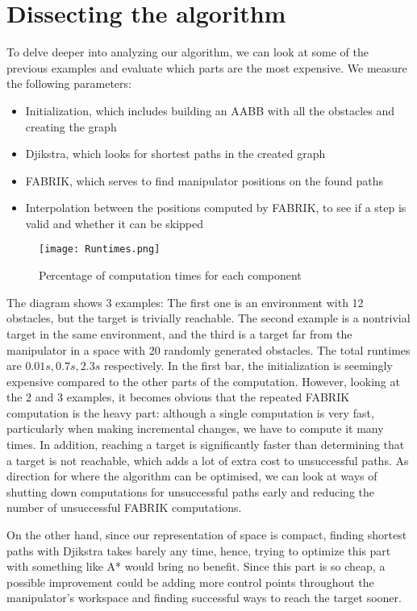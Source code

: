 \newpage

\section{Dissecting the algorithm}

To delve deeper into analyzing our algorithm, we can look at some of the previous examples and evaluate which parts are the most expensive. We measure the following parameters:

\begin{itemize}
\item Initialization, which includes building an AABB with all the obstacles and creating the graph
\item Djikstra, which looks for shortest paths in the created graph
\item FABRIK, which serves to find manipulator positions on the found paths
\item Interpolation between the positions computed by FABRIK, to see if a step is valid and whether it can be skipped
\end{itemize}

\begin{wrapfigure}{r}{0.50\textwidth}
  \centering
  \texttt{[image: Runtimes.png]}
  \caption{Percentage of computation times for each component}
\end{wrapfigure}

The diagram shows 3 examples: The first one is an environment with 12 obstacles, but the target is trivially reachable. The second example is a nontrivial target in the same environment, and the third is a target far from the manipulator in a space with 20 randomly generated obstacles. The total runtimes are $0.01s, 0.7s, 2.3s$ respectively. In the first bar, the initialization is seemingly expensive compared to the other parts of the computation. However, looking at the 2\nd{} and 3\rd{} examples, it becomes obvious that the repeated FABRIK computation is the heavy part: although a single computation is very fast, particularly when making incremental changes, we have to compute it many times. In addition, reaching a target is significantly faster than determining that a target is not reachable, which adds a lot of extra cost to unsuccessful paths. As direction for where the algorithm can be optimised, we can look at ways of shutting down computations for unsuccessful paths early and reducing the number of unsuccessful FABRIK computations.

On the other hand, since our representation of space is compact, finding shortest paths with Djikstra takes barely any time, hence, trying to optimize this part with something like A* would bring no benefit. Since this part is so cheap, a possible improvement could be adding more control points throughout the manipulator's workspace and finding successful ways to reach the target sooner.

